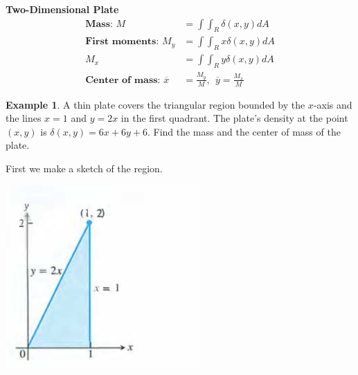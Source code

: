 \documentclass[12pt, letter]{article}
\theoremstyle{plain}
\numberwithin{theorem}{section}
\theoremstyle{definition}
\newtheorem{example}[theorem]{Example}
\begin{document}
\bigskip

\textbf{Two-Dimensional Plate}
\begin{align*}
\textbf{Mass: } M&=\int\int_R \delta(x,y) dA\\
\textbf{First moments: } M_{y} &= \int \int_R x\delta(x,y)dA\\ M_{x} &= \int \int_R y\delta(x,y)dA\\ 
\textbf{Center of mass: } \overline{x} &= \frac{M_{y}}{M}, \ \ \overline{y} = \frac{M_{x}}{M}
\end{align*}

\bigskip

\hrulefill

\bigskip

\begin{example}
A thin plate covers the triangular region bounded by the $x$-axis and the lines $x=1$ and $y=2x$ in the first quadrant. The plate's density at the point $(x,y)$ is $\delta(x,y) = 6x+6y+6$. Find the mass and the center of mass of the plate.

\bigskip

First we make a sketch of the region.

\bigskip

\begin{center}
\includegraphics[scale=0.7]{m3_f17}
\end{center}

\bigskip


\end{example}
\end{document}
